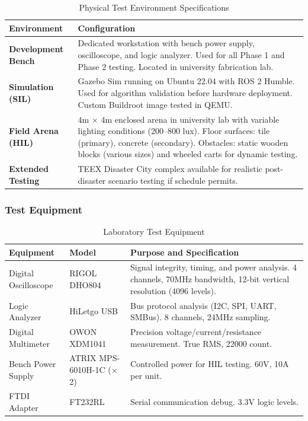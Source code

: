 \begin{table}[H]
    \centering
    \caption{Physical Test Environment Specifications}
    \label{tab:physical_env}
    \begin{tabular}{@{}p{3cm}p{9cm}@{}}
        \toprule
        \textbf{Environment} & \textbf{Configuration} \\
        \midrule
        \textbf{Development Bench} & Dedicated workstation with bench power supply, oscilloscope, and logic analyzer. Used for all Phase 1 and Phase 2 testing. Located in university fabrication lab. \\
        \midrule
        \textbf{Simulation (SIL)} & Gazebo Sim running on Ubuntu 22.04 with ROS 2 Humble. Used for algorithm validation before hardware deployment. Custom Buildroot image tested in QEMU. \\
        \midrule
        \textbf{Field Arena (HIL)} & 4m $\times$ 4m enclosed arena in university lab with variable lighting conditions (200--800 lux). Floor surfaces: tile (primary), concrete (secondary). Obstacles: static wooden blocks (various sizes) and wheeled carts for dynamic testing. \\
        \midrule
        \textbf{Extended Testing} & TEEX Disaster City complex available for realistic post-disaster scenario testing if schedule permits. \\
        \bottomrule
    \end{tabular}
\end{table}

\subsubsection{Test Equipment}

\begin{table}[H]
    \centering
    \caption{Laboratory Test Equipment}
    \label{tab:test_equipment}
    \begin{tabular}{@{}llp{5cm}@{}}
        \toprule
        \textbf{Equipment} & \textbf{Model} & \textbf{Purpose and Specification} \\
        \midrule
        Digital Oscilloscope & RIGOL DHO804 & Signal integrity, timing, and power analysis. 4 channels, 70MHz bandwidth, 12-bit vertical resolution (4096 levels). \\
        Logic Analyzer & HiLetgo USB & Bus protocol analysis (I2C, SPI, UART, SMBus). 8 channels, 24MHz sampling. \\
        Digital Multimeter & OWON XDM1041 & Precision voltage/current/resistance measurement. True RMS, 22000 count. \\
        Bench Power Supply & ATRIX MPS-6010H-1C ($\times$2) & Controlled power for HIL testing. 60V, 10A per unit. \\
        FTDI Adapter & FT232RL & Serial communication debug. 3.3V logic levels. \\
        \bottomrule
    \end{tabular}
\end{table}

